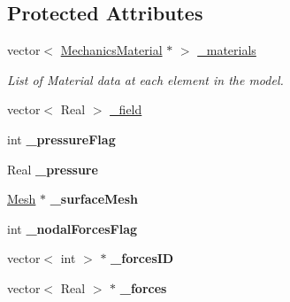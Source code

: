 \subsection*{Protected Attributes}
\begin{DoxyCompactItemize}
\item 
\hypertarget{classvoom_1_1_mechanics_model_abdba86a197a3e053f7fc3d98a4c35e8d}{
vector$<$ \hyperlink{classvoom_1_1_mechanics_material}{MechanicsMaterial} $\ast$ $>$ \hyperlink{classvoom_1_1_mechanics_model_abdba86a197a3e053f7fc3d98a4c35e8d}{\_\-materials}}
\label{classvoom_1_1_mechanics_model_abdba86a197a3e053f7fc3d98a4c35e8d}

\begin{DoxyCompactList}\small\item\em List of Material data at each element in the model. \item\end{DoxyCompactList}\item 
vector$<$ Real $>$ \hyperlink{classvoom_1_1_mechanics_model_a0c96adf9c1e07f5b604a3db9ffe9b750}{\_\-field}
\item 
\hypertarget{classvoom_1_1_mechanics_model_a29fe651bd66bebc10f448c2a1e0cb255}{
int {\bfseries \_\-pressureFlag}}
\label{classvoom_1_1_mechanics_model_a29fe651bd66bebc10f448c2a1e0cb255}

\item 
\hypertarget{classvoom_1_1_mechanics_model_a9af310f78ef6e9d5903eb9624a55b033}{
Real {\bfseries \_\-pressure}}
\label{classvoom_1_1_mechanics_model_a9af310f78ef6e9d5903eb9624a55b033}

\item 
\hypertarget{classvoom_1_1_mechanics_model_a99688bb2b736b933fcdecc9d5ebe4ba9}{
\hyperlink{classvoom_1_1_mesh}{Mesh} $\ast$ {\bfseries \_\-surfaceMesh}}
\label{classvoom_1_1_mechanics_model_a99688bb2b736b933fcdecc9d5ebe4ba9}

\item 
\hypertarget{classvoom_1_1_mechanics_model_abbd7f67d13e6ae3aedb25e8b87fb4ce3}{
int {\bfseries \_\-nodalForcesFlag}}
\label{classvoom_1_1_mechanics_model_abbd7f67d13e6ae3aedb25e8b87fb4ce3}

\item 
\hypertarget{classvoom_1_1_mechanics_model_a935f58ecabcad603cdce6df9445ecffd}{
vector$<$ int $>$ $\ast$ {\bfseries \_\-forcesID}}
\label{classvoom_1_1_mechanics_model_a935f58ecabcad603cdce6df9445ecffd}

\item 
\hypertarget{classvoom_1_1_mechanics_model_a4ed281e882e7e93ff9f6807e7c8eef11}{
vector$<$ Real $>$ $\ast$ {\bfseries \_\-forces}}
\label{classvoom_1_1_mechanics_model_a4ed281e882e7e93ff9f6807e7c8eef11}


\end{DoxyCompactItemize}
